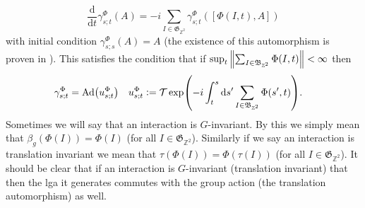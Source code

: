 \documentclass[12pt,a4paper,twoside]{article}
\renewcommand{\d}{\text{d}}
\newcommand{\defeq}{\vcentcolon=}
\let\originalleft\left
\let\originalright\right
\renewcommand{\left}{\mathopen{}\mathclose\bgroup\originalleft}
\renewcommand{\right}{\aftergroup\egroup\originalright}
\newcommand{\ZZ}{\mathbb Z}
\newcommand{\Ad}[1]{\textrm{Ad}\left(#1\right)}
\theoremstyle{definition}
\numberwithin{equation}{section}
\begin{document}
\begin{equation}
	\frac{\d}{\d t}\gamma^{\Phi}_{s;t}(A)=-i\sum_{I\in\mathfrak{G}_{\ZZ^2}}\gamma^{\Phi}_{s;t}([\Phi(I,t),A])
\end{equation}
with initial condition $\gamma^{\Phi}_{s;s}(A)=A$ (the existence of this automorphism is proven in \cite{doi:10.1063/1.5095769}). This satisfies the condition that if $\sup_t\norm{\sum_{I\in\mathfrak{B}_{\ZZ^2}}\Phi(I,t)}<\infty$ then
\begin{align}
	\gamma^\Phi_{s;t}&=\Ad{u^\Phi_{s;t}}&u^\Phi_{s;t}&\defeq\mathcal{T}\exp(-i\int_t^s\d s'\sum_{I\in\mathfrak{B}_{\ZZ^2}}\Phi(s',t)).
\end{align}
Sometimes we will say that an interaction is $G$-invariant. By this we simply mean that $\beta_g(\Phi(I))=\Phi(I)$ (for all $I\in\mathfrak{G}_{\ZZ^2}$). Similarly if we say an interaction is translation invariant we mean that $\tau(\Phi(I))=\Phi(\tau(I))$ (for all $I\in\mathfrak{G}_{\ZZ^2}$). It should be clear that if an interaction is $G$-invariant (translation invariant) that then the lga it generates commutes with the group action (the translation automorphism) as well.
\end{document}

